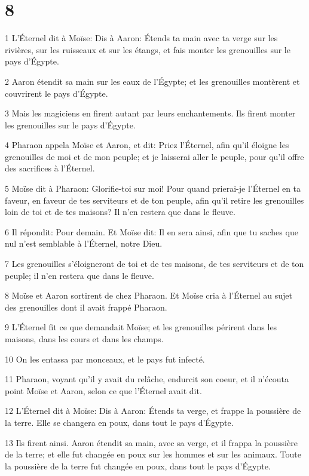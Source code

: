 \chapter{8}

\par 1 L'Éternel dit à Moïse: Dis à Aaron: Étends ta main avec ta verge sur les rivières, sur les ruisseaux et sur les étangs, et fais monter les grenouilles sur le pays d'Égypte.
\par 2 Aaron étendit sa main sur les eaux de l'Égypte; et les grenouilles montèrent et couvrirent le pays d'Égypte.
\par 3 Mais les magiciens en firent autant par leurs enchantements. Ils firent monter les grenouilles sur le pays d'Égypte.
\par 4 Pharaon appela Moïse et Aaron, et dit: Priez l'Éternel, afin qu'il éloigne les grenouilles de moi et de mon peuple; et je laisserai aller le peuple, pour qu'il offre des sacrifices à l'Éternel.
\par 5 Moïse dit à Pharaon: Glorifie-toi sur moi! Pour quand prierai-je l'Éternel en ta faveur, en faveur de tes serviteurs et de ton peuple, afin qu'il retire les grenouilles loin de toi et de tes maisons? Il n'en restera que dans le fleuve.
\par 6 Il répondit: Pour demain. Et Moïse dit: Il en sera ainsi, afin que tu saches que nul n'est semblable à l'Éternel, notre Dieu.
\par 7 Les grenouilles s'éloigneront de toi et de tes maisons, de tes serviteurs et de ton peuple; il n'en restera que dans le fleuve.
\par 8 Moïse et Aaron sortirent de chez Pharaon. Et Moïse cria à l'Éternel au sujet des grenouilles dont il avait frappé Pharaon.
\par 9 L'Éternel fit ce que demandait Moïse; et les grenouilles périrent dans les maisons, dans les cours et dans les champs.
\par 10 On les entassa par monceaux, et le pays fut infecté.
\par 11 Pharaon, voyant qu'il y avait du relâche, endurcit son coeur, et il n'écouta point Moïse et Aaron, selon ce que l'Éternel avait dit.
\par 12 L'Éternel dit à Moïse: Dis à Aaron: Étends ta verge, et frappe la poussière de la terre. Elle se changera en poux, dans tout le pays d'Égypte.
\par 13 Ils firent ainsi. Aaron étendit sa main, avec sa verge, et il frappa la poussière de la terre; et elle fut changée en poux sur les hommes et sur les animaux. Toute la poussière de la terre fut changée en poux, dans tout le pays d'Égypte.
